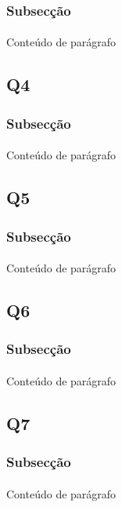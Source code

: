 \documentclass[12pt]{article}
\begin{document}
\subsubsection{Subsecção}
\paragraph{}

Conteúdo de parágrafo
\subsection{Q4}
\subsubsection{Subsecção}
\paragraph{}

Conteúdo de parágrafo
\subsection{Q5}
\subsubsection{Subsecção}
\paragraph{}

Conteúdo de parágrafo
\subsection{Q6}
\subsubsection{Subsecção}
\paragraph{}

Conteúdo de parágrafo
\subsection{Q7}
\subsubsection{Subsecção}
\paragraph{}

Conteúdo de parágrafo
\end{document}
